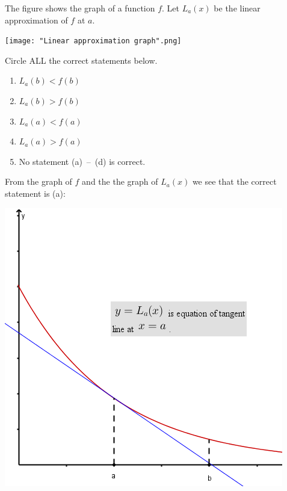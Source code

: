 \documentclass[nooutcomes,handout]{ximera}
\begin{document}
\begin{problem}

  The figure shows the graph of a function $f$.
  Let $L_a(x)$ be the linear approximation of $f$ at $a$.
  \begin{image}
    \texttt{[image: "Linear approximation graph".png]}
  \end{image}
  Circle ALL the correct statements below.
  \begin{enumerate}
    \item
      $L_a(b) < f(b)$
    \item
      $L_a(b) > f(b)$
    \item
      $L_a(a) < f(a)$
    \item
      $L_a(a) > f(a)$
    \item
      No statement (a)~--~(d) is correct.
  \end{enumerate}
  \begin{freeResponse}
    From the graph of $f$ and the the graph of $L_a(x)$ we see that the correct statement is (a):
    \begin{image}
      \includegraphics[scale = .5]{figure2.png}
    \end{image}
  \end{freeResponse}
\end{problem}
\end{document}
